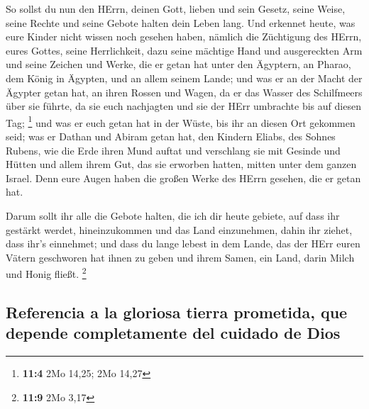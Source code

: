  So sollst du nun den HErrn, deinen Gott, lieben und sein
Gesetz, seine Weise, seine Rechte und seine Gebote halten dein Leben
lang.  Und erkennet heute, was eure Kinder nicht wissen
noch gesehen haben, nämlich die Züchtigung des HErrn, eures Gottes,
seine Herrlichkeit, dazu seine mächtige Hand und ausgereckten Arm
 und seine Zeichen und Werke, die er getan hat unter den
Ägyptern, an Pharao, dem König in Ägypten, und an allem seinem Lande;
 und was er an der Macht der Ägypter getan hat, an ihren
Rossen und Wagen, da er das Wasser des Schilfmeers über sie führte, da
sie euch nachjagten und sie der HErr umbrachte bis auf diesen Tag;
\footnote{\textbf{11:4} 2Mo 14,25; 2Mo 14,27}  und was er
euch getan hat in der Wüste, bis ihr an diesen Ort gekommen seid;
 was er Dathan und Abiram getan hat, den Kindern Eliabs,
des Sohnes Rubens, wie die Erde ihren Mund auftat und verschlang sie mit
Gesinde und Hütten und allem ihrem Gut, das sie erworben hatten, mitten
unter dem ganzen Israel.  Denn eure Augen haben die großen
Werke des HErrn gesehen, die er getan hat.

 Darum sollt ihr alle die Gebote halten, die ich dir heute
gebiete, auf dass ihr gestärkt werdet, hineinzukommen und das Land
einzunehmen, dahin ihr ziehet, dass ihr's einnehmet;  und
dass du lange lebest in dem Lande, das der HErr euren Vätern geschworen
hat ihnen zu geben und ihrem Samen, ein Land, darin Milch und Honig
fließt. \footnote{\textbf{11:9} 2Mo 3,17}

\hypertarget{referencia-a-la-gloriosa-tierra-prometida-que-depende-completamente-del-cuidado-de-dios}{%
\subsection{Referencia a la gloriosa tierra prometida, que depende
completamente del cuidado de
Dios}\label{referencia-a-la-gloriosa-tierra-prometida-que-depende-completamente-del-cuidado-de-dios}}

